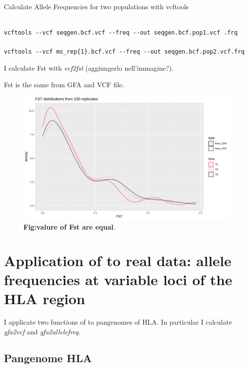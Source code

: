Calculate Allele Frequencies for two populations with vcftools
\begin{verbatim}

vcftools --vcf seqgen.bcf.vcf --freq --out seqgen.bcf.pop1.vcf .frq

vcftools --vcf ms_rep{1}.bcf.vcf --freq --out seqgen.bcf.pop2.vcf.frq 

\end{verbatim}

I calculate Fst with \textit{vcf2fst} (aggiungerlo nell'immagine?). %

Fst is the same from GFA and VCF file.


\begin{figure}[H]
\centering
\includegraphics[width=1.00\textwidth]{fig/fst_time (1).png}
\decoRule
\caption{\textbf{Fig:valure of Fst are equal}.}
\label{fig:fsttime.png}
\end{figure}






\section{Application of \vgp to real data: allele frequencies at variable loci of the HLA region}

I applicate two functions of \vgp to pangenomes of HLA. In particular I calculate \textit{gfa2vcf} and \textit{gfa2allelefreq}.

\subsection{Pangenome HLA}

